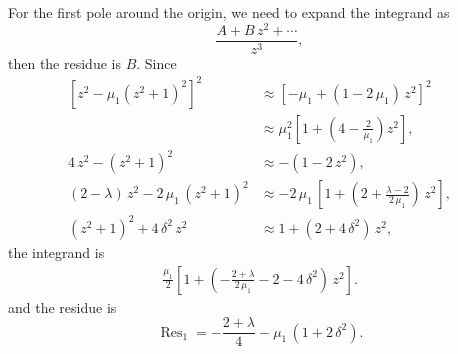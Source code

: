 \documentclass[reprint, floatfix]{revtex4-1}
\begin{document}
{For the first pole around the origin,
we need to expand the integrand as
$$
\frac{ A + B \, z^2 + \cdots }
     {          z^3          },
$$
then the residue is $B$.
%
Since
$$
\begin{aligned}
\left[ z^2 - \mu_1 (z^2 + 1)^2 \right]^2
&
\approx
[ - \mu_1 + (1 - 2 \, \mu_1) \, z^2]^2
\\
&
\approx
\mu_1^2
\left[
  1 + \left(4 - \tfrac { 2  } { \mu_1 } \right) z^2
\right],
\\
%
4 \, z^2 - ( z^2 + 1 )^2
&
\approx
-( 1 - 2 \, z^2 ),
\\
%
(2 - \lambda) \, z^2 - 2 \, \mu_1 \, (z^2 + 1)^2
&
\approx
-2 \, \mu_1 \,
\left[
  1 + \left(
        2 + \tfrac{ \lambda - 2 } { 2 \, \mu_1 }
      \right)
      \, z^2
\right],
\\
%
( z^2 + 1 )^2 + 4 \, \delta^2 \, z^2
&
\approx
1 + (2 + 4 \, \delta^2) \, z^2,
\end{aligned}
$$
the integrand is
$$
\begin{aligned}
\frac{ \mu_1 }
     {   2   }
\left[
  1 + \left(
        - \frac{ 2 + \lambda } { 2 \, \mu_1 }
        - 2 - 4 \, \delta^2
      \right) \, z^2
\right].
\end{aligned}
$$
and the residue is
$$
\operatorname{Res}_1
=
  - \frac{ 2 + \lambda } { 4 }
  - \mu_1 \, \left( 1 + 2 \, \delta^2 \right).
$$


}
\end{document}
